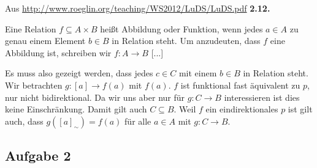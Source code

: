 \begin{enumerate}[a)]
  Aus \url{http://www.roeglin.org/teaching/WS2012/LuDS/LuDS.pdf}{ \textbf{2.12.}}

  \begin{definition}
  Eine Relation $f \subseteq A \times B $ heißt Abbildung oder Funktion, wenn
jedes $a \in A$ zu genau einem Element $b \in B$ in Relation steht. Um anzudeuten, dass $f$ eine Abbildung ist, schreiben wir $f: A \to B$ [...]
  \end{definition}

  Es muss also gezeigt werden, dass jedes $c \in C$ mit einem $b \in B$ in Relation steht.
  Wir betrachten $ g: [a] \to f(a) $ mit $f(a)$.  $f$ ist funktional fast äquivalent zu $p$, nur nicht bidirektional.
  Da wir uns aber nur für $g: C \to B$ interessieren ist dies keine Einschränkung.
  Damit gilt auch $C \subseteq B$.
  Weil $f$ ein eindirektionales $p$ ist gilt auch,
  dass $g([a]_{\sim}) = f(a)$
  für alle $a\in A$ mit $g:C\to B.$
  \end{enumerate}

  \subsection*{Aufgabe 2}


